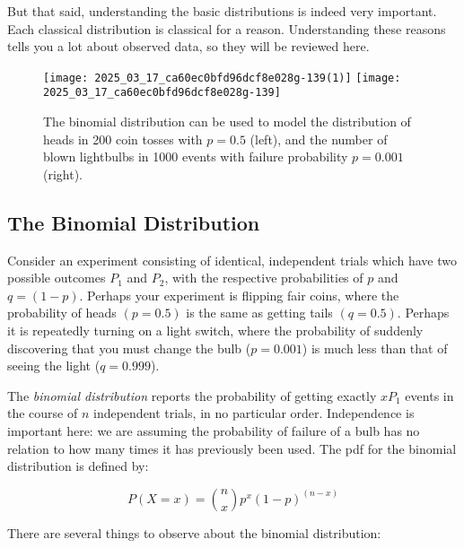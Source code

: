 \documentclass[10pt]{article}
\begin{document}
But that said, understanding the basic distributions is indeed very important. Each classical distribution is classical for a reason. Understanding these reasons tells you a lot about observed data, so they will be reviewed here.

\begin{figure}
\centering
\texttt{[image: 2025\_03\_17\_ca60ec0bfd96dcf8e028g-139(1)]}
\texttt{[image: 2025\_03\_17\_ca60ec0bfd96dcf8e028g-139]}
\caption{The binomial distribution can be used to model the distribution of heads in 200 coin tosses with $p=0.5$ (left), and the number of blown lightbulbs in 1000 events with failure probability $p=0.001$ (right).}
\end{figure}

\subsection{The Binomial Distribution}
Consider an experiment consisting of identical, independent trials which have two possible outcomes $P_{1}$ and $P_{2}$, with the respective probabilities of $p$ and $q=(1-p)$. Perhaps your experiment is flipping fair coins, where the probability of heads $(p=0.5)$ is the same as getting tails $(q=0.5)$. Perhaps it is repeatedly turning on a light switch, where the probability of suddenly discovering that you must change the bulb ($p=0.001$) is much less than that of seeing the light ($q=0.999$).

The \textit{binomial distribution} reports the probability of getting exactly $x P_{1}$ events in the course of $n$ independent trials, in no particular order. Independence is important here: we are assuming the probability of failure of a bulb has no relation to how many times it has previously been used. The pdf for the binomial distribution is defined by:

\[
P(X=x)=\binom{n}{x} p^{x}(1-p)^{(n-x)}
\]

There are several things to observe about the binomial distribution:
\end{document}
